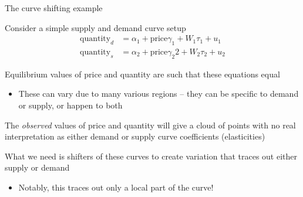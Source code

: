 \documentclass[notes,11pt, aspectratio=169]{beamer}
\newenvironment{wideitemize}{\itemize\addtolength{\itemsep}{10pt}}{\enditemize}
\begin{document}
\begin{frame}{The curve shifting example}
  \begin{wideitemize}
  \item Consider a simple supply and demand curve setup
    \begin{align}
      \text{quantity}_{d} &= \alpha_{1} + \text{price}\gamma_{1} + W_{1}\tau_{1} + u_{1}\\
      \text{quantity}_{s} &= \alpha_{2} + \text{price}\gamma_2{2} + W_{2}\tau_{2} + u_{2}
    \end{align}
  \item Equilibrium values of price and quantity are such that these
    equations equal
    \begin{itemize}
    \item These can vary due to many various regions -- they can be
      specific to demand or supply, or happen to both
    \end{itemize}
  \item The \emph{observed} values of price and quantity will give a
    cloud of points with no real interpretation as either demand or
    supply curve coefficients (elasticities)

  \item What we need is shifters of these curves to create variation
    that traces out either supply or demand
    \begin{itemize}
    \item Notably, this traces out only a local part of the curve!
    \end{itemize}
  \end{wideitemize}
  
\end{frame}
\end{document}
